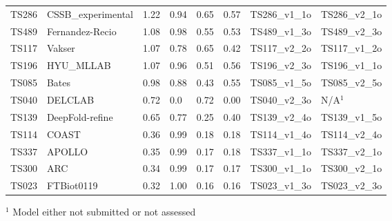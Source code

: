 \begin{table}[ht]
{\begin{tabular}{llllllll}
TS286 & CSSB\_experimental & 1.22 & 0.94 & 0.65 & 0.57 & TS286\_v1\_1o & TS286\_v2\_1o \\ 
TS489 & Fernandez-Recio & 1.08 & 0.98 & 0.55 & 0.53 & TS489\_v1\_3o & TS489\_v2\_3o \\ 
TS117 & Vakser & 1.07 & 0.78 & 0.65 & 0.42 & TS117\_v2\_2o & TS117\_v1\_2o \\ 
TS196 & HYU\_MLLAB & 1.07 & 0.96 & 0.51 & 0.56 & TS196\_v2\_3o & TS196\_v1\_1o \\ 
TS085 & Bates & 0.98 & 0.88 & 0.43 & 0.55 & TS085\_v1\_5o & TS085\_v2\_5o \\ 
TS040 & DELCLAB & 0.72 & 0.0 & 0.72 & 0.00 & TS040\_v2\_3o & N/A$^{1}$ \\ 
TS139 & DeepFold-refine & 0.65 & 0.77 & 0.25 & 0.40 & TS139\_v2\_4o & TS139\_v1\_5o \\ 
TS114 & COAST & 0.36 & 0.99 & 0.18 & 0.18 & TS114\_v1\_4o & TS114\_v2\_4o \\ 
TS337 & APOLLO & 0.35 & 0.99 & 0.17 & 0.18 & TS337\_v1\_1o & TS337\_v2\_1o \\ 
TS300 & ARC & 0.34 & 0.99 & 0.17 & 0.17 & TS300\_v1\_1o & TS300\_v2\_1o \\ 
TS023 & FTBiot0119 & 0.32 & 1.00 & 0.16 & 0.16 & TS023\_v1\_3o & TS023\_v2\_3o \\ 
\bottomrule
\end{tabular}%
}
\begin{flushleft}\footnotesize $^{1}$ Model either not submitted or not assessed\end{flushleft}
\end{table}
